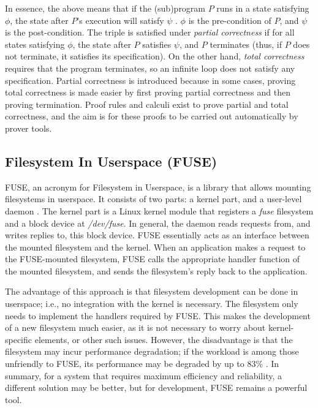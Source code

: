 In essence, the above means that if the (sub)program $P$ runs in a state satisfying $\phi$, the state after $P$'s execution will satisfy $\psi$ \cite{huth2004}.
$\phi$ is the pre-condition of $P$, and $\psi$ is the post-condition.
The triple is satisfied under \textit{partial correctness} if for all states satisfying $\phi$, the state after $P$ satisfies $\psi$, and $P$ terminates (thus, if $P$ does not terminate, it satisfies its specification).
On the other hand, \textit{total correctness} requires that the program terminates, so an infinite loop does not satisfy any specification.
Partial correctness is introduced because in some cases, proving total correctness is made easier by first proving partial correctness and then proving termination.
Proof rules and calculi exist to prove partial and total correctness, and the aim is for these proofs to be carried out automatically by prover tools.

\subsection{Filesystem In Userspace (FUSE)}
FUSE, an acronym for Filesystem in Userspace, is a library that allows mounting filesystems in userspace.
It consists of two parts: a kernel part, and a user-level daemon \cite{vangoor2017}.
The kernel part is a Linux kernel module that registers a \textit{fuse} filesystem and a block device at \textit{/dev/fuse}.
In general, the daemon reads requests from, and writes replies to, this block device.
FUSE essentially acts as an interface between the mounted filesystem and the kernel.
When an application makes a request to the FUSE-mounted filesystem, FUSE calls the appropriate handler function of the mounted filesystem, and sends the filesystem's reply back to the application.

The advantage of this approach is that filesystem development can be done in userspace; i.e., no integration with the kernel is necessary.
The filesystem only needs to implement the handlers required by FUSE.
This makes the development of a new filesystem much easier, as it is not necessary to worry about kernel-specific elements, or other such issues.
However, the disadvantage is that the filesystem may incur performance degradation; if the workload is among those unfriendly to FUSE, its performance may be degraded by up to 83\% \cite{vangoor2017}.
In summary, for a system that requires maximum efficiency and reliability, a different solution may be better, but for development, FUSE remains a powerful tool.
